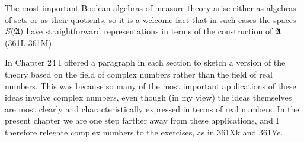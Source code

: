 {The most important Boolean algebras of measure theory arise either as
algebras of sets or as their quotients, so it is a welcome fact that in
such cases the spaces $S(\frak A)$ have straightforward representations
in terms of the construction of $\frak A$ (361L-361M).

In Chapter 24 I offered a paragraph in each section to sketch a version
of the theory based on the field of complex numbers rather than the
field of real numbers.   This was because so many of the most important
applications of these ideas involve complex numbers, even though (in my
view) the ideas themselves are most clearly and characteristically
expressed in terms of real numbers.   In the present chapter we are one
step farther away from these applications, and I therefore relegate
complex numbers to the exercises, as in 361Xk and 361Ye.

}%

\discrpage

